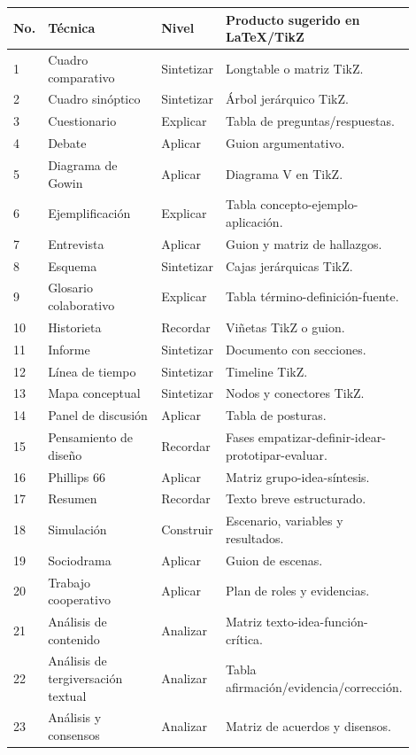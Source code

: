 \begin{longtable}{@{}p{0.08\linewidth}p{0.35\linewidth}p{0.16\linewidth}p{0.31\linewidth}@{}}
\toprule
\textbf{No.} & \textbf{Técnica} & \textbf{Nivel} & \textbf{Producto sugerido en LaTeX/TikZ} \\
\midrule
\endhead
1 & Cuadro comparativo & Sintetizar & Longtable o matriz TikZ. \\
2 & Cuadro sinóptico & Sintetizar & Árbol jerárquico TikZ. \\
3 & Cuestionario & Explicar & Tabla de preguntas/respuestas. \\
4 & Debate & Aplicar & Guion argumentativo. \\
5 & Diagrama de Gowin & Aplicar & Diagrama V en TikZ. \\
6 & Ejemplificación & Explicar & Tabla concepto-ejemplo-aplicación. \\
7 & Entrevista & Aplicar & Guion y matriz de hallazgos. \\
8 & Esquema & Sintetizar & Cajas jerárquicas TikZ. \\
9 & Glosario colaborativo & Explicar & Tabla término-definición-fuente. \\
10 & Historieta & Recordar & Viñetas TikZ o guion. \\
11 & Informe & Sintetizar & Documento con secciones. \\
12 & Línea de tiempo & Sintetizar & Timeline TikZ. \\
13 & Mapa conceptual & Sintetizar & Nodos y conectores TikZ. \\
14 & Panel de discusión & Aplicar & Tabla de posturas. \\
15 & Pensamiento de diseño & Recordar & Fases empatizar-definir-idear-prototipar-evaluar. \\
16 & Phillips 66 & Aplicar & Matriz grupo-idea-síntesis. \\
17 & Resumen & Recordar & Texto breve estructurado. \\
18 & Simulación & Construir & Escenario, variables y resultados. \\
19 & Sociodrama & Aplicar & Guion de escenas. \\
20 & Trabajo cooperativo & Aplicar & Plan de roles y evidencias. \\
21 & Análisis de contenido & Analizar & Matriz texto-idea-función-crítica. \\
22 & Análisis de tergiversación textual & Analizar & Tabla afirmación/evidencia/corrección. \\
23 & Análisis y consensos & Analizar & Matriz de acuerdos y disensos. \\

\end{longtable}
